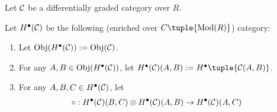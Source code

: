 \begin{definition}
    Let \( {\mathcal{C}} \) be a differentially graded category over  \( R \).

    Let \( H^\bullet({\mathcal{C}}) \) be the following (enriched over \( C\tuple{\Mod(R)} \)) category:
    \begin{enumerate}
        \item Let \( \operatorname{Obj}(H^\bullet({\mathcal{C}})) := \operatorname{Obj}({\mathcal{C}}) \).
        \item For any \( A, B \in \operatorname{Obj}(H^\bullet({\mathcal{C}})) \), let \( H^\bullet(\Cc)(A, B) := H^\bullet \tuple{\Cc(A, B)} \).
        \item {


            For any \( A, B, C \in H^\bullet({\mathcal{C}}) \), let
            \begin{align*}
                \circ: H^\bullet({\mathcal{C}})(B, C) \otimes H^\bullet({\mathcal{C}})(A, B) &\to H^\bullet({\mathcal{C}})(A, C)
            \end{align*}
        }
    \end{enumerate}
\end{definition}

